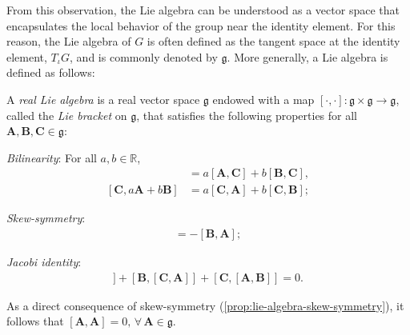 From this observation, the Lie algebra can be understood as a vector space that encapsulates the local behavior of the group near the identity element. For this reason, the Lie algebra of $G$ is often defined as the tangent space at the identity element, $T_\iota G$, and is commonly denoted by $\mathfrak{g}$. More generally, a Lie algebra is defined as follows:
\begin{definition}
    A \emph{real Lie algebra} is a real vector space $\mathfrak{g}$ endowed with a map $[\cdot, \cdot]:\mathfrak{g}\times\mathfrak{g}\to\mathfrak{g}$, called the \emph{Lie bracket} on $\mathfrak{g}$, that satisfies the following properties for all $\mathbf{A},\mathbf{B},\mathbf{C}\in\mathfrak{g}$:
    \begin{property}
        \item \emph{Bilinearity}: For all $a,b\in\mathbb{R}$,
        \begin{align*}
            [a\mathbf{A}+b\mathbf{B}, \mathbf{C}] &= a[\mathbf{A}, \mathbf{C}] + b[\mathbf{B}, \mathbf{C}], \\
             [\mathbf{C}, a\mathbf{A}+b\mathbf{B}] &= a[\mathbf{C}, \mathbf{A}] + b[\mathbf{C}, \mathbf{B}];
        \end{align*}
        \item \emph{Skew-symmetry}: 
        \begin{align*}
            [\mathbf{A}, \mathbf{B}] = -[\mathbf{B}, \mathbf{A}];
        \end{align*} \label{prop:lie-algebra-skew-symmetry}
        \item \emph{Jacobi identity}:
        \begin{align*}
            [\mathbf{A}, [\mathbf{B}, \mathbf{C}]] + [\mathbf{B}, [\mathbf{C}, \mathbf{A}]] + [\mathbf{C}, [\mathbf{A}, \mathbf{B}]] = 0.
        \end{align*}
    \end{property}
\end{definition}
As a direct consequence of skew-symmetry (\cref{prop:lie-algebra-skew-symmetry}), it follows that $[\mathbf{A}, \mathbf{A}]=0,\,\forall\,\mathbf{A}\in\mathfrak{g}$. 

